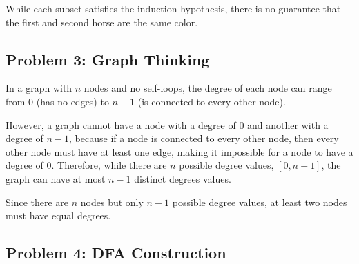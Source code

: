 \documentclass{article}
\begin{document}
While each subset satisfies the induction hypothesis, there is no guarantee that the first and second horse are the same color.

\subsection*{Problem 3: Graph Thinking}

In a graph with $n$ nodes and no self-loops, the degree of each node can range from $0$ (has no edges) to $n-1$ (is connected to every other node).
\vspace{1em}

However, a graph cannot have a node with a degree of $0$ and another with a degree of $n-1$, because if a node is connected to every other node, then every other node must have at least one edge, making it impossible for a node to have a degree of $0$. Therefore, while there are $n$ possible degree values, $[0, n-1]$, the graph can have at most $n-1$ distinct degrees values.
\vspace{1em}

Since there are $n$ nodes but only $n-1$ possible degree values, at least two nodes must have equal degrees.

\subsection*{Problem 4: DFA Construction}
\end{document}
